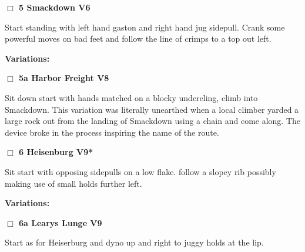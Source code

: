 	\begin{multicols}{2}


\needspace{1.5cm}
\label{rt:Smackdown}
\colorbox{RoyalBlue!20}{
\parbox{0.95\linewidth}{
\hspace{-1ex}\textbf{$\Box$
5 Smackdown V6  
}}}
\begin{adjustwidth}{1.3em}{}			
Start standing with left hand gaston and right hand jug sidepull. Crank some powerful moves on bad feet and follow the line of crimps to a top out left.
\end{adjustwidth}


\begin{adjustwidth}{0.5cm}{}				
\needspace{3cm}
\textbf{Variations:} \newline

\needspace{1.5cm}
\label{vr:Harbor Freight}
\colorbox{Goldenrod!20}{
\parbox{0.95\linewidth}{
\hspace{-1ex}\textbf{$\Box$
5a Harbor Freight V8  
}}}
\begin{adjustwidth}{1.3em}{}			
Sit down start with hands matched on a blocky undercling, climb into Smackdown. This variation was literally unearthed when a local climber yarded a large rock out from the landing of Smackdown using a chain and come along. The device broke in the process inspiring the name of the route.
\end{adjustwidth}



\end{adjustwidth}


\needspace{1.5cm}
\label{rt:Heisenburg}
\colorbox{Goldenrod!20}{
\parbox{0.95\linewidth}{
\hspace{-1ex}\textbf{$\Box$
6 Heisenburg V9*  
}}}
\begin{adjustwidth}{1.3em}{}			
Sit start with opposing sidepulls on a low flake. follow a slopey rib possibly making use of small holds further left.
\end{adjustwidth}


\begin{adjustwidth}{0.5cm}{}				
\needspace{3cm}
\textbf{Variations:} \newline

\needspace{1.5cm}
\label{vr:Learys Lunge}
\colorbox{Goldenrod!20}{
\parbox{0.95\linewidth}{
\hspace{-1ex}\textbf{$\Box$
6a Learys Lunge V9  
}}}
\begin{adjustwidth}{1.3em}{}			
Start as for Heiserburg and dyno up and right to juggy holds at the lip.
\end{adjustwidth}




\end{adjustwidth}
\end{multicols}
